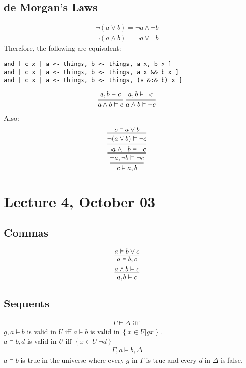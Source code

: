 \documentclass{article}
\theoremstyle{sltheorem}
\begin{document}
\subsection{de Morgan's Laws}
\begin{align}
    \neg (a \vee b) = \neg a \wedge \neg b\\
    \neg (a \wedge b) = \neg a \vee \neg b
\end{align}
Therefore, the following are equivalent:
\begin{verbatim}
and [ c x | a <- things, b <- things, a x, b x ]
and [ c x | a <- things, b <- things, a x && b x ]
and [ c x | a <- things, b <- things, (a &:& b) x ]
\end{verbatim}
\begin{align}
    \infer={a\wedge b \vDash c}{a, b \vDash c}\:\:
    \infer={a \wedge b \vDash \neg c}{a, b \vDash \neg c}
\end{align}
Also:
\begin{align}
    \infer={c\vDash a,b}{
        \infer={\neg a, \neg b \vDash \neg c}{
            \infer={\neg a \wedge \neg b \vDash \neg c}{
                \infer={\neg (a\vee b)\vDash \neg c}{
                    c\vDash a\vee b
                }
            }
        }
    }
\end{align}
\section{Lecture 4, October 03}
\subsection{Commas}
\begin{align}
    \infer{a\vDash b,c}{a \vDash b \vee c}\\
    \infer{a,b\vDash c}{a\wedge b\vDash c}
\end{align}
\subsection{Sequents}
\begin{align}
    \Gamma \vDash \Delta \text{ iff }
\end{align}
$g,a\vDash b$ is valid in $U$ iff $a\vDash b$ is valid in $\left\{x \in U | g x\right\}$.\\
$a\vDash b,d$ is valid in $U$ iff $\left\{x \in U | \neg d \right\}$\\
\begin{align}
    \Gamma, a \vDash b, \Delta
\end{align}
$a \vDash b$ is true in the universe where every $g$ in $\Gamma$ is true and every $d$ in $\Delta$ is false.
\end{document}
